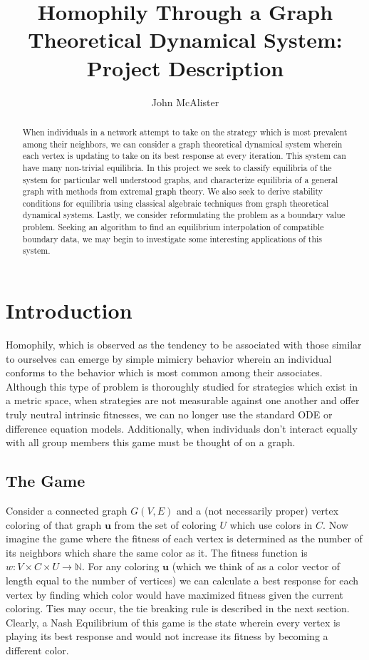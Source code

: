 \documentclass[]{article}
\title{Homophily Through a Graph Theoretical Dynamical System: Project Description}
\author{John McAlister}
\begin{document}
\maketitle

\begin{abstract}
	When individuals in a network attempt to take on the strategy which is most prevalent among their neighbors, we can consider a graph theoretical dynamical system wherein each vertex is updating to take on its best response at every iteration. This system can have many non-trivial equilibria. In this project we seek to classify equilibria of the system for particular well understood graphs, and characterize equilibria of a general graph with methods from extremal graph theory. We also seek to derive stability conditions for equilibria using classical algebraic techniques from graph theoretical dynamical systems. Lastly, we consider reformulating the problem as a boundary value problem. Seeking an algorithm to find an equilibrium interpolation of compatible boundary data, we may begin to investigate some interesting applications of this system.   
\end{abstract}

\section{Introduction}
Homophily, which is observed as the tendency to be associated with those similar to ourselves can emerge by simple mimicry behavior wherein an individual conforms to the behavior which is most common among their associates. Although this type of problem is thoroughly studied for strategies which exist in a metric space, when strategies are not measurable against one another and offer truly neutral intrinsic fitnesses, we can no longer use the standard ODE or difference equation models. Additionally, when individuals don't interact equally with all group members this game must be thought of on a graph. 
\subsection{The Game}
Consider a connected graph $G(V,E)$ and a (not necessarily proper) vertex coloring of that graph $\mathbf{u}$ from the set of coloring $U$ which use colors in $C$. Now imagine the game where the fitness of each vertex is determined as the number of its neighbors which share the same color as it. The fitness function is $w:V\times C\times U\rightarrow \mathbb{N}$.
For any coloring $\mathbf{u}$ (which we think of as a color vector of length equal to the number of vertices) we can calculate a best response for each vertex by finding which color would have maximized fitness given the current coloring. Ties may occur, the tie breaking rule is described in the next section. Clearly, a Nash Equilibrium of this game is the state wherein every vertex is playing its best response and would not increase its fitness by becoming a different color. 
\end{document}
